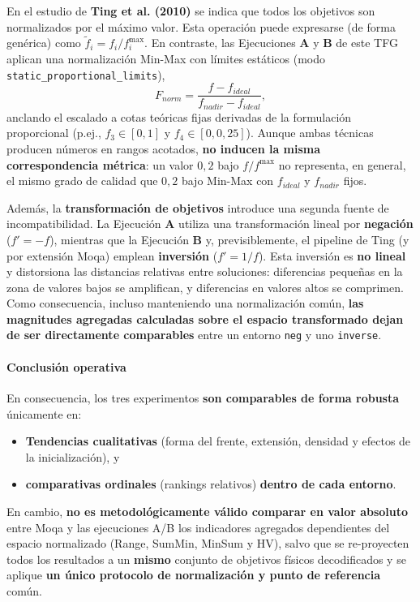 \documentclass[a4paper,10pt]{article}
\begin{document}
En el estudio de \textbf{Ting et al. (2010)} se indica que \guillemotleft todos los objetivos son normalizados por el máximo valor\guillemotright. Esta operación puede expresarse (de forma genérica) como $\tilde{f}_i = f_i / f_i^{\max}$. En contraste, las Ejecuciones \textbf{A} y \textbf{B} de este TFG aplican una normalización Min-Max con límites estáticos (modo \texttt{static\_proportional\_limits}),
\begin{equation}
F_{norm} = \frac{f - f_{ideal}}{f_{nadir} - f_{ideal}},
\end{equation}
anclando el escalado a cotas teóricas fijas derivadas de la formulación proporcional (p.ej., $f_3 \in [0,1]$ y $f_4 \in [0,0{,}25]$). Aunque ambas técnicas producen números en rangos acotados, \textbf{no inducen la misma correspondencia métrica}: un valor $0{,}2$ bajo $f/f^{\max}$ no representa, en general, el mismo grado de calidad que $0{,}2$ bajo Min-Max con $f_{ideal}$ y $f_{nadir}$ fijos.

Además, la \textbf{transformación de objetivos} introduce una segunda fuente de incompatibilidad. La Ejecución \textbf{A} utiliza una transformación lineal por \textbf{negación} ($f'=-f$), mientras que la Ejecución \textbf{B} y, previsiblemente, el pipeline de Ting (y por extensión Moqa) emplean \textbf{inversión} ($f'=1/f$). Esta inversión es \textbf{no lineal} y distorsiona las distancias relativas entre soluciones: diferencias pequeñas en la zona de valores bajos se amplifican, y diferencias en valores altos se comprimen. Como consecuencia, incluso manteniendo una normalización común, \textbf{las magnitudes agregadas calculadas sobre el espacio transformado dejan de ser directamente comparables} entre un entorno \texttt{neg} y uno \texttt{inverse}.

\paragraph{Conclusión operativa}
En consecuencia, los tres experimentos \textbf{son comparables de forma robusta} únicamente en:
\begin{itemize}
    \item \textbf{Tendencias cualitativas} (forma del frente, extensión, densidad y efectos de la inicialización), y
    \item \textbf{comparativas ordinales} (rankings relativos) \textbf{dentro de cada entorno}.
\end{itemize}
En cambio, \textbf{no es metodológicamente válido comparar en valor absoluto} entre Moqa y las ejecuciones A/B los indicadores agregados dependientes del espacio normalizado (Range, SumMin, MinSum y HV), salvo que se re-proyecten todos los resultados a un \textbf{mismo} conjunto de objetivos físicos decodificados y se aplique \textbf{un único protocolo de normalización y punto de referencia} común.
\end{document}
